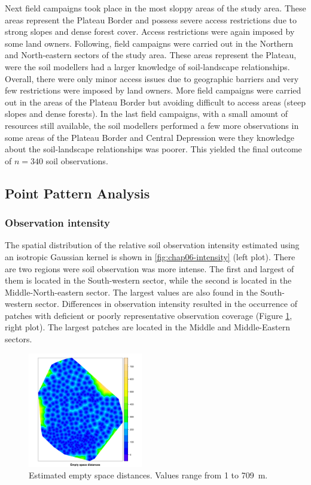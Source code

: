 Next field campaigns took place in the most sloppy areas of the study area. These areas represent the Plateau 
Border and possess severe access restrictions due to strong slopes and dense forest cover. Access restrictions 
were again imposed by some land owners. Following, field campaigns were carried out in the Northern and 
North-eastern sectors of the study area. These areas represent the Plateau, were the soil modellers had a 
larger knowledge of soil-landscape relationships. Overall, there were only minor access issues due to 
geographic barriers and very few restrictions were imposed by land owners. More field campaigns were carried 
out in the areas of the Plateau Border but avoiding difficult to access areas (steep slopes and dense forests).
In the last field campaigns, with a small amount of resources still available, the soil modellers performed a 
few more observations in some areas of the Plateau Border and Central Depression were they knowledge about the 
soil-landscape relationships was poorer. This yielded the final outcome of $n = 340$ soil observations.

\subsection{Point Pattern Analysis}

\subsubsection{Observation intensity}

The spatial distribution of the relative soil observation intensity estimated using an isotropic Gaussian 
kernel is shown in \autoref{fig:chap06-intensity} (left plot). There are two regions were soil observation was 
more intense. The first and largest of them is located in the South-western sector, while the second is 
located in the Middle-North-eastern sector. The largest values are also found in the South-western sector. 
Differences in observation intensity resulted in the occurrence of patches with deficient or poorly 
representative observation coverage (Figure \ref{fig:chap06-intensity}, right plot). The largest patches are 
located in the Middle and Middle-Eastern sectors.

\begin{figure}[!ht]
 \centering
 \includegraphics[width=5cm]{fig/chap06-empty-space}
 \caption{Estimated empty space distances. Values range from \num{1} to \SI{709}{\m}.}
\label{fig:chap06-intensity}
\end{figure}


